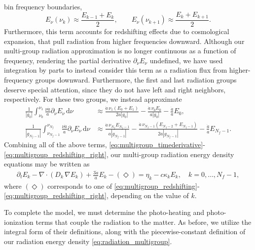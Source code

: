 \documentclass[10pt]{article}
\renewcommand{\(}{\left(}
\renewcommand{\)}{\right)}
\newcommand{\adot}{\dot{a}}
\newcommand{\Enu}{E_{\nu}}
\newcommand{\mn}{{\tt n}}
\begin{document}
bin frequency boundaries, 
\[
   \Enu(\nu_k) \approx \frac{E_{k-1}+E_k}{2}, \qquad
   \Enu(\nu_{k+1}) \approx \frac{E_{k}+E_{k+1}}{2}.
\]
Furthermore, this term accounts for redshifting
effects due to cosmological expansion, that pull radiation from higher
frequencies downward.  Although our multi-group radiation approximation
is no longer continuous as a function of frequency, rendering the
partial derivative $\partial_\nu\Enu$ undefined, we have used
integration by parts to instead consider this term as a radiation flux
from higher-frequency groups downward.  Furthermore, the first and
last radiation groups deserve special attention, since they do not
have left and right neighbors, respectively.  For these two groups, we
instead approximate
\begin{align}
 \label{eq:multigroup_redshifting_left}
   \frac{1}{|g_0|} \int_{\nu_0}^{\nu_1} \frac{\nu \adot}{a}\partial_{\nu}\Enu\,\mathrm d\nu
   &\approx
   \frac{\adot\, \nu_1 (E_0+E_1)}{2a|g_0|} -
   \frac{\adot\, \nu_0 E_0}{a|g_0|} - \frac{\adot}{a}E_0,
\\
 \label{eq:multigroup_redshifting_right}
   \frac{1}{|g_{N_f-1}|} \int_{\nu_{N_f-1}}^{\nu_{N_f}} \frac{\nu \adot}{a}\partial_{\nu}\Enu\,\mathrm d\nu
   &\approx
   \frac{\adot\, \nu_{N_f} E_{N_f-1}}{a|g_{N_f-1}|} -
   \frac{\adot\, \nu_{N_f-1} (E_{N_f-2}+E_{N_f-1})}{2a|g_{N_f-1}|} - \frac{\adot}{a}E_{N_f-1}.
\end{align}
Combining all of the above terms,
\eqref{eq:multigroup_timederivative}-\eqref{eq:multigroup_redshifting_right},
our multi-group radiation energy density equations may be written as
\begin{align}
  \label{eq:mgfld_multigroup}
  \partial_{t} E_k - \nabla\cdot(D_k\,\nabla E_k) 
      + \frac{3 \adot}{a} E_k - (\Diamond)
    = \eta_k - c \kappa_k E_k,\quad k=0,\ldots,N_f-1,
\end{align}
where $(\Diamond)$ corresponds to one of
\eqref{eq:multigroup_redshifting}-\eqref{eq:multigroup_redshifting_right},
depending on the value of $k$.

To complete the model, we must determine the photo-heating and
photo-ionization terms that couple the radiation to the matter.  As
before, we utilize the integral form of their definitions, along with
the piecewise-constant definition of our radiation energy density
\eqref{eq:radiation_multigroup}.  
\end{document}
